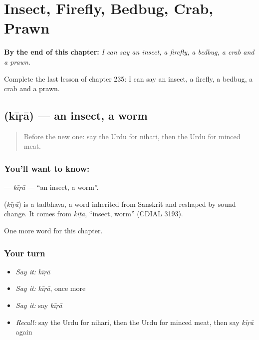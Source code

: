
\chapter{Insect, Firefly, Bedbug, Crab, Prawn}
\label{ch:ur-insect-firefly-bedbug-crab-prawn}

\begin{chapteropening}
\textbf{By the end of this chapter:} \emph{I can say an insect, a firefly, a bedbug, a crab and a prawn.}

Complete the last lesson of chapter 235: I can say an insect, a firefly, a bedbug, a crab and a prawn.
\end{chapteropening}

\section[\texorpdfstring{\ur{کیڑا} (kīṛā)}{کیڑا (kīṛā)}]{ (kīṛā) — an insect, a worm}

\label{lesson:UR-C235-kira}



\begin{quote}
Before the new one: say the Urdu for nihari, then the Urdu for minced meat.
\end{quote}

\subsection*{You'll want to know: }
\textbf{} — \emph{kīṛā} — \textquotedblleft{}an insect, a worm\textquotedblright{}.

\begin{cousinweb}
\textbf{} (\emph{kīṛā}) is a tadbhava, a word inherited from Sanskrit and reshaped by sound change. It comes from \emph{kīṭa}, \textquotedblleft{}insect, worm\textquotedblright{} (CDIAL 3193).
\end{cousinweb}

\begin{grammarlens}[title={What you've built}]
One more word for this chapter.
\end{grammarlens}

\subsection*{Your turn}
\begin{itemize}
\raggedright
  \item \emph{Say it:} \emph{kīṛā}
  \item \emph{Say it:} \emph{kīṛā}, once more
  \item \emph{Say it:} say \emph{kīṛā}
  \item \emph{Recall:} say the Urdu for nihari, then the Urdu for minced meat, then say \emph{kīṛā} again
\end{itemize}

